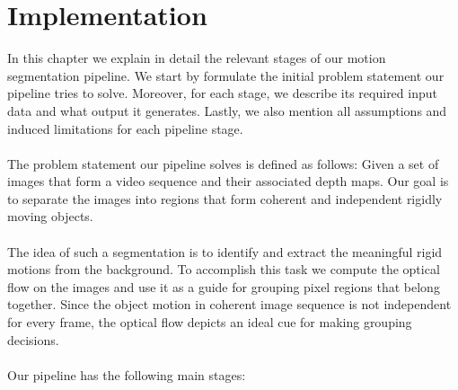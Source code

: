 \chapter{Implementation}

In this chapter we explain in detail the relevant stages of our motion segmentation pipeline. We start by formulate the initial problem statement our pipeline tries to solve. Moreover, for each stage, we describe its required input data and what output it generates. Lastly, we also mention all assumptions and induced limitations for each pipeline stage. \\ \\
The problem statement our pipeline solves is defined as follows: 
Given a set of images that form a video sequence and their associated depth maps. Our goal is to separate the images into regions that form coherent and independent rigidly moving objects. \\ \\
The idea of such a segmentation is to identify and extract the meaningful rigid motions from the background. To accomplish this task we compute the optical flow on the images and use it as a guide for grouping pixel regions that belong together. Since the object motion in coherent image sequence is not independent for every frame, the optical flow depicts an ideal cue for making grouping decisions. \\ \\
Our pipeline has the following main stages:

